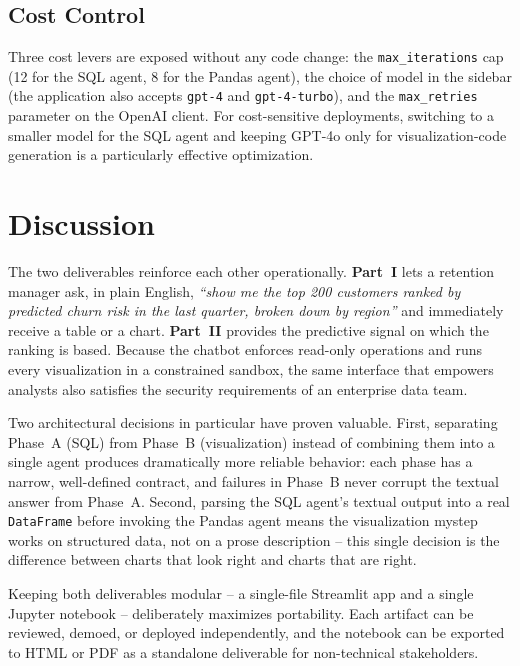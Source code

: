 \documentclass[11pt,a4paper]{article}
\begin{document}
\subsection{Cost Control}

Three cost levers are exposed without any code change:
the \texttt{max\_iterations} cap (12 for the SQL agent, 8 for the
Pandas agent), the choice of model in the sidebar (the application
also accepts \texttt{gpt-4} and \texttt{gpt-4-turbo}), and the
\texttt{max\_retries} parameter on the OpenAI client. For
cost-sensitive deployments, switching to a smaller model for the SQL
agent and keeping GPT-4o only for visualization-code generation is a
particularly effective optimization.

\section{Discussion}

The two deliverables reinforce each other operationally. \textbf{Part~I}
lets a retention manager ask, in plain English, \textit{``show me the
top 200 customers ranked by predicted churn risk in the last quarter,
broken down by region''} and immediately receive a table or a chart.
\textbf{Part~II} provides the predictive signal on which the ranking is
based. Because the chatbot enforces read-only operations and runs every
visualization in a constrained sandbox, the same interface that
empowers analysts also satisfies the security requirements of an
enterprise data team.

Two architectural decisions in particular have proven valuable.
First, separating Phase~A (SQL) from Phase~B (visualization) instead
of combining them into a single agent produces dramatically more
reliable behavior: each phase has a narrow, well-defined contract, and
failures in Phase~B never corrupt the textual answer from Phase~A.
Second, parsing the SQL agent's textual output into a real
\texttt{DataFrame} before invoking the Pandas agent means the
visualization mystep works on structured data, not on a prose
description -- this single decision is the difference between charts
that look right and charts that are right.

Keeping both deliverables modular -- a single-file Streamlit app and a
single Jupyter notebook -- deliberately maximizes portability. Each
artifact can be reviewed, demoed, or deployed independently, and the
notebook can be exported to HTML or PDF as a standalone deliverable
for non-technical stakeholders.
\end{document}
